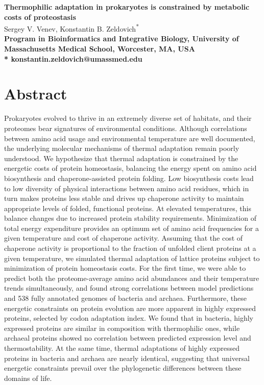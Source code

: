 \documentclass[10pt,letterpaper]{article}
\date{}
\begin{document}
\vspace*{0.35in}


\begin{flushleft}
{\Large
\textbf{Thermophilic adaptation in prokaryotes is constrained by metabolic costs of proteostasis}
}
\newline
\\
Sergey V. Venev, 
Konstantin B. Zeldovich\textsuperscript{*}
\\
\bigskip
\bf{} Program in Bioinformatics and Integrative Biology, University of Massachusetts Medical School, Worcester, MA, USA
\\
\bigskip
* konstantin.zeldovich@umassmed.edu
\end{flushleft}

\section*{Abstract}
Prokaryotes evolved to thrive in an extremely diverse set of habitats, and their proteomes bear signatures of environmental conditions. Although correlations between amino acid usage and environmental temperature are well documented, the underlying molecular mechanisms of thermal adaptation remain poorly understood. We hypothesize that thermal adaptation is constrained by the energetic costs of protein homeostasis, balancing the energy spent on amino acid biosynthesis and chaperone-assisted protein folding. Low biosynthesis costs lead to low diversity of physical interactions between amino acid residues, which in turn makes proteins less stable and drives up chaperone activity to maintain appropriate levels of folded, functional proteins. At elevated temperatures, this balance changes due to increased protein stability requirements. Minimization of total energy expenditure provides an optimum set of amino acid frequencies for a given temperature and cost of chaperone activity. Assuming that the cost of chaperone activity is proportional to the fraction of unfolded client proteins at a given temperature, we simulated thermal adaptation of lattice proteins subject to minimization of protein homeostasis costs. For the first time, we were able to predict both the proteome-average amino acid abundances and their temperature trends simultaneously, and found strong correlations between model predictions and 538 fully annotated genomes of bacteria and archaea. Furthermore, these energetic constraints on protein evolution are more apparent in highly expressed proteins, selected by codon adaptation index. We found that in bacteria, highly expressed proteins are similar in composition with thermophilic ones, while archaeal proteins showed no correlation between predicted expression level and thermostability.
At the same time, thermal adaptations of highly expressed proteins in bacteria and archaea are nearly identical, suggesting that universal energetic constraints prevail over the phylogenetic differences between these domains of life.
\end{document}
